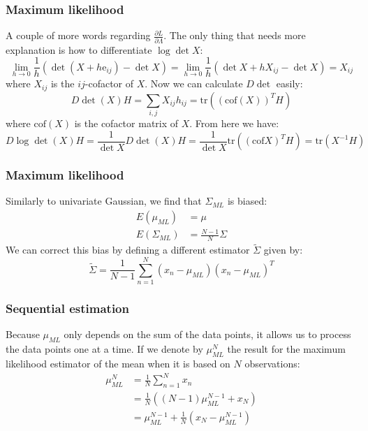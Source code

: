 \documentclass{beamer}
\begin{document}
\begin{frame}
    \frametitle{Maximum likelihood}
    A couple of more words regarding $\frac{\partial{}L}{\partial\Lambda}$. The only thing that needs more explanation is how to differentiate $\log\det{}X$:
    \begin{equation*}
        \lim_{h\to{}0}\frac{1}{h}(\det(X+h\mathrm{e}_{ij})-\det{}X)=\lim_{h\to{}0}\frac{1}{h}(\det{}X+hX_{ij}-\det{}X)=X_{ij}
    \end{equation*}
    where $X_{ij}$ is the $ij$-cofactor of $X$. Now we can calculate $D\det$ easily:
    \begin{equation*}
        D\det{}(X)H=\sum_{i,j}X_{ij}h_{ij}=\mathrm{tr}((\mathrm{cof}(X))^{T}H)
    \end{equation*}
    where $\mathrm{cof}(X)$ is the cofactor matrix of $X$. From here we have:
    \begin{equation*}
        D\log\det{}(X)H=\frac{1}{\det{}X}D\det{}(X)H=\frac{1}{\det{}X}\mathrm{tr}((\mathrm{cof}X)^{T}H)=\mathrm{tr}(X^{-1}H)
    \end{equation*}
\end{frame}

\begin{frame}
    \frametitle{Maximum likelihood}
    Similarly to univariate Gaussian, we find that $\Sigma_{ML}$ is biased:
    \begin{align*}
        E(\mu_{ML})&=\mu \\
        E(\Sigma_{ML})&=\frac{N-1}{N}\Sigma
    \end{align*}
    We can correct this bias by defining a different estimator $\tilde{\Sigma}$ given by:
    \begin{equation*}
        \tilde{\Sigma}=\frac{1}{N-1}\sum_{n=1}^{N}(x_{n}-\mu_{ML})(x_{n}-\mu_{ML})^{T}
    \end{equation*}
\end{frame}

\begin{frame}
    \frametitle{Sequential estimation}
    Because $\mu_{ML}$ only depends on the sum of the data points, it allows us to process the data points one at a time. If we denote by $\mu_{ML}^{N}$ the result for the maximum likelihood estimator of the mean when it is based on $N$ observations:
    \begin{align*}
        \mu_{ML}^{N}&=\frac{1}{N}\sum_{n=1}^{N}x_{n} \\
        &=\frac{1}{N}((N-1)\mu_{ML}^{N-1}+x_{N}) \\
        &=\mu_{ML}^{N-1}+\frac{1}{N}(x_{N}-\mu_{ML}^{N-1})
    \end{align*}
\end{frame}
\end{document}
